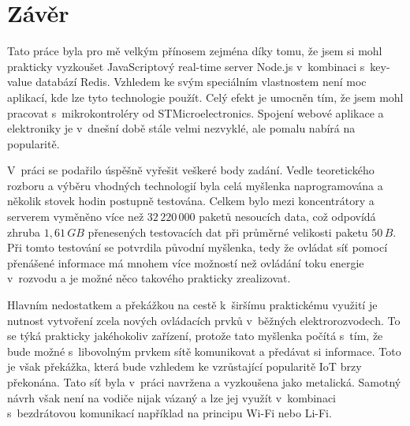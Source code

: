 \chapter{Závěr}
Tato práce byla pro mě velkým přínosem zejména díky tomu, že jsem si mohl prakticky vyzkoušet JavaScriptový real-time server Node.js v~kombinaci s~key-value databází Redis. Vzhledem ke svým speciálním vlastnostem není moc aplikací, kde lze tyto technologie použít. Celý efekt je umocněn tím, že jsem  mohl pracovat s~mikrokontroléry od STMicroelectronics. Spojení webové aplikace a elektroniky je v~dnešní době stále velmi nezvyklé, ale pomalu nabírá na popularitě.

V~práci se podařilo úspěšně vyřešit veškeré body zadání. Vedle teoretického rozboru a výběru vhodných technologií byla celá myšlenka naprogramována a několik stovek hodin postupně testována. Celkem bylo mezi koncentrátory a serverem vyměněno více než $32\,220\,000$ paketů nesoucích data, což odpovídá zhruba $1,61\,GB$ přenesených testovacích dat při průměrné velikosti paketu $50\,B$. Při tomto testování se potvrdila původní myšlenka, tedy že ovládat síť pomocí přenášené informace má mnohem více možností než ovládání toku energie v~rozvodu a je možné něco takového prakticky zrealizovat.

Hlavním nedostatkem a překážkou na cestě k~širšímu praktickému využití je nutnost vytvoření zcela nových ovládacích prvků v~běžných elektrorozvodech. To se týká prakticky jakéhokoliv zařízení, protože tato myšlenka počítá s~tím, že bude možné s~libovolným prvkem sítě komunikovat a předávat si informace. Toto je však překážka, která bude vzhledem ke vzrůstající popularitě IoT brzy překonána. Tato síť byla v~práci navržena a vyzkoušena jako metalická. Samotný návrh však není na vodiče nijak vázaný a lze jej využít v~kombinaci s~bezdrátovou komunikací například na principu Wi-Fi nebo Li-Fi.